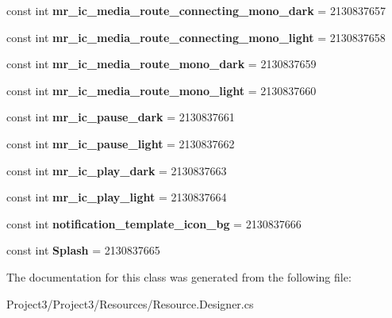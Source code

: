 \begin{DoxyCompactItemize}
const int {\bfseries mr\+\_\+ic\+\_\+media\+\_\+route\+\_\+connecting\+\_\+mono\+\_\+dark} = 2130837657
\item 
\mbox{\label{classXaria_1_1Resource_1_1Drawable_af381681d4d33f663efbf3e4c5479a4c5}} 
const int {\bfseries mr\+\_\+ic\+\_\+media\+\_\+route\+\_\+connecting\+\_\+mono\+\_\+light} = 2130837658
\item 
\mbox{\label{classXaria_1_1Resource_1_1Drawable_a79a26cc14d82c948848fb1081bd0f1b9}} 
const int {\bfseries mr\+\_\+ic\+\_\+media\+\_\+route\+\_\+mono\+\_\+dark} = 2130837659
\item 
\mbox{\label{classXaria_1_1Resource_1_1Drawable_a9a2d76d247d3e4c693cd9c42145d2cb7}} 
const int {\bfseries mr\+\_\+ic\+\_\+media\+\_\+route\+\_\+mono\+\_\+light} = 2130837660
\item 
\mbox{\label{classXaria_1_1Resource_1_1Drawable_ae43aa2abfc405b3067104a7dd620582d}} 
const int {\bfseries mr\+\_\+ic\+\_\+pause\+\_\+dark} = 2130837661
\item 
\mbox{\label{classXaria_1_1Resource_1_1Drawable_a1ec9b0d8b2b307342aaeaa133c943dff}} 
const int {\bfseries mr\+\_\+ic\+\_\+pause\+\_\+light} = 2130837662
\item 
\mbox{\label{classXaria_1_1Resource_1_1Drawable_a57ab7717286aaa6d218fd7e793b4d845}} 
const int {\bfseries mr\+\_\+ic\+\_\+play\+\_\+dark} = 2130837663
\item 
\mbox{\label{classXaria_1_1Resource_1_1Drawable_ae1cadef6adb7238625ff3ed95f4d61f2}} 
const int {\bfseries mr\+\_\+ic\+\_\+play\+\_\+light} = 2130837664
\item 
\mbox{\label{classXaria_1_1Resource_1_1Drawable_a7e90421ca396b665cd7f40f1c73e210e}} 
const int {\bfseries notification\+\_\+template\+\_\+icon\+\_\+bg} = 2130837666
\item 
\mbox{\label{classXaria_1_1Resource_1_1Drawable_ad3bd8dbb7da84a2ad377a8b1f9cd856a}} 
const int {\bfseries Splash} = 2130837665
\end{DoxyCompactItemize}


The documentation for this class was generated from the following file\+:\begin{DoxyCompactItemize}
\item 
Project3/\+Project3/\+Resources/Resource.\+Designer.\+cs\end{DoxyCompactItemize}
